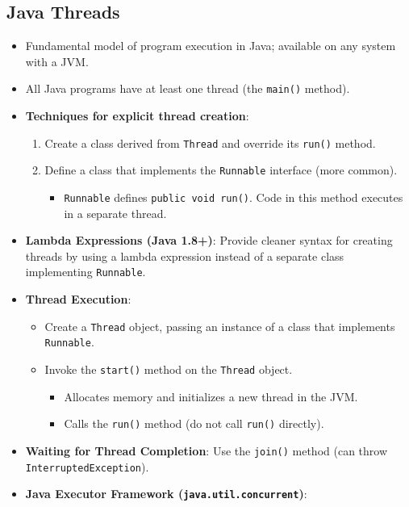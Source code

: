 \subsection{Java Threads}
\begin{itemize}
    \item Fundamental model of program execution in Java; available on any system with a JVM.
    \item All Java programs have at least one thread (the \texttt{main()} method).
    \item \textbf{Techniques for explicit thread creation}:
        \begin{enumerate}
            \item Create a class derived from \texttt{Thread} and override its \texttt{run()} method.
            \item Define a class that implements the \texttt{Runnable} interface (more common).
                \begin{itemize}
                    \item \texttt{Runnable} defines \texttt{public void run()}. Code in this method executes in a separate thread.
                \end{itemize}
        \end{enumerate}
    \item \textbf{Lambda Expressions (Java 1.8+)}: Provide cleaner syntax for creating threads by using a lambda expression instead of a separate class implementing \texttt{Runnable}.
    \item \textbf{Thread Execution}:
        \begin{itemize}
            \item Create a \texttt{Thread} object, passing an instance of a class that implements \texttt{Runnable}.
            \item Invoke the \texttt{start()} method on the \texttt{Thread} object.
                \begin{itemize}
                    \item Allocates memory and initializes a new thread in the JVM.
                    \item Calls the \texttt{run()} method (do not call \texttt{run()} directly).
                \end{itemize}
        \end{itemize}
    \item \textbf{Waiting for Thread Completion}: Use the \texttt{join()} method (can throw \texttt{InterruptedException}).
    \item \textbf{Java Executor Framework (\texttt{java.util.concurrent})}:

\end{itemize}
